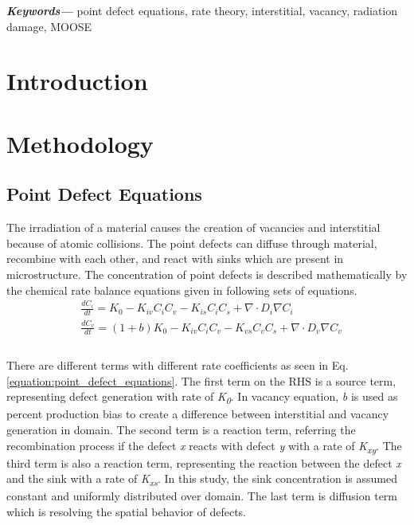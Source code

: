 \documentclass[a4paper]{article}
\providecommand{\keywords}[1]
{
  \small
  \textbf{\textit{Keywords---}} #1
}
\begin{document}
\keywords{point defect equations, rate theory, interstitial, vacancy, radiation damage, MOOSE}

% 


\section{Introduction} \hspace{10pt}
\newpage
\section{Methodology} \hspace{10pt}

\subsection{Point Defect Equations} \hspace{10pt}
The irradiation of a material causes the creation of vacancies and interstitial because of
atomic collisions. The point defects can diffuse through material, recombine with each other,
and react with sinks which are present in microstructure. The concentration of point defects is
described mathematically by the chemical rate balance equations given in following sets of equations.\\

\begin{equation}
  \begin{aligned}
    &\frac{dC_i}{dt} = K_0 - K_{iv}C_iC_v - K_{is}C_iC_s + \nabla\cdot D_i\nabla C_i\\
    &\frac{dC_v}{dt} = (1+b)K_0 - K_{iv}C_iC_v - K_{vs}C_vC_s + \nabla\cdot D_v\nabla C_v\\
  \end{aligned}
  \label{equation:point_defect_equations}
\end{equation}\\

There are different terms with different rate coefficients as seen in Eq. \ref{equation:point_defect_equations}. The first term on the RHS is a source term, representing defect generation with rate of \textit{K\textsubscript{0}}. In vacancy equation, \textit{b} is used as percent production bias to create a difference between interstitial and vacancy generation in domain. The second term is a reaction term, referring the recombination process if the defect \textit{x} reacts with defect \textit{y} with a rate of \textit{K\textsubscript{xy}}. The third term is also a reaction term, representing the reaction between the defect \textit{x} and the sink  with a rate of \textit{K\textsubscript{xs}}. In this study, the sink concentration is assumed constant and uniformly distributed over domain. The last term is diffusion term which is resolving the spatial behavior of defects.\\
\end{document}
